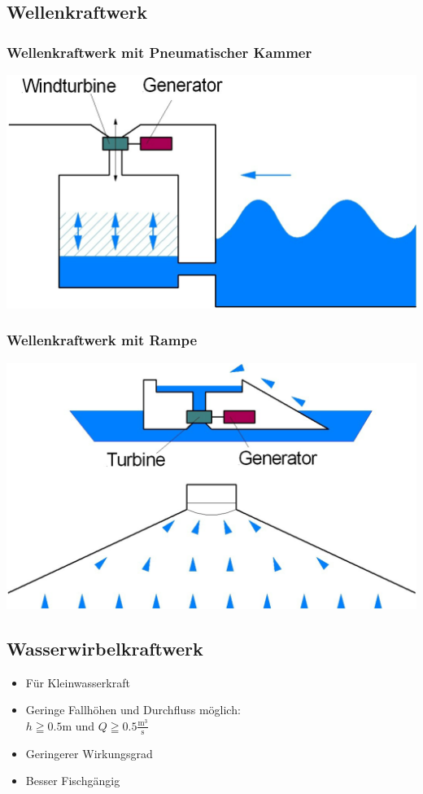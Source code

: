 \subsection{Wellenkraftwerk}

\subsubsection{Wellenkraftwerk mit Pneumatischer Kammer}
\includegraphics[width=0.65\columnwidth, align=c]{images/Wellenkraft mit Pneumatischer Kammer.png}


\subsubsection{Wellenkraftwerk mit Rampe}
\includegraphics[width=0.65\columnwidth, align=c]{images/Wellenkraft mit Rampe.png}



\subsection{Wasserwirbelkraftwerk}

\begin{itemize}
    \item Für Kleinwasserkraft
    \item Geringe Fallhöhen und Durchfluss möglich:\\
    $h \geqq 0.5\text{m}$ und $Q \geqq 0.5 \frac{\text{m}^3}{\text{s}}$
    \item Geringerer Wirkungsgrad
    \item Besser Fischgängig
\end{itemize}



